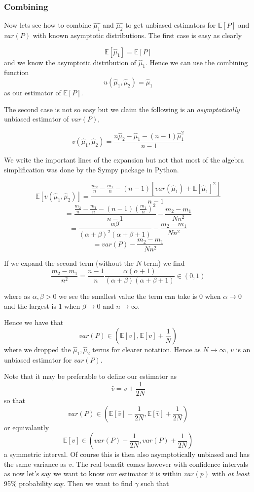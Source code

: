 \documentclass[
10pt, %
a4paper, %
oneside, %
headinclude,footinclude, %
BCOR5mm, %
]{scrartcl}
\begin{document}
\subsubsection{Combining}
Now lets see how to combine $\hat{\mu_1}$ and $\hat{\mu_2}$ to get unbiased estimators for $\mathbb{E}[P]$ and $var(P)$ with known asymptotic distributions. The first case is easy as clearly

$$ \mathbb{E}[\hat{\mu}_1] = \mathbb{E}[P] $$
and we know the asymptotic distribution of $\hat{\mu}_1$. Hence we can use the combining function 
$$u(\hat{\mu}_1,\hat{\mu}_2) = \hat{\mu}_1$$ 
as our estimator of $\mathbb{E}[P]$. 

The second case is not so easy but we claim the following is an \textit{asymptotically} unbiased estimator of $var(P)$,

$$ v(\hat{\mu}_1,\hat{\mu}_2) = \frac{n \hat{\mu}_2 - \hat{\mu}_1 - (n-1)\hat{\mu}_1^2}{n-1}$$

We write the important lines of the expansion but not that most of the algebra simplification was done by the Sympy package in Python.

$$ \mathbb{E}[v(\hat{\mu}_1,\hat{\mu}_2)] = \frac{\frac{m_2}{n} - \frac{m_1}{n} - (n-1)[var(\hat{\mu}_1) + \mathbb{E}[\hat{\mu}_1]^2]}{n-1} $$
$$ = \frac{\frac{m_2}{n} - \frac{m_1}{n} - (n-1)(\frac{m_1}{n})^2}{n-1} - \frac{m_2 - m_1}{N n^2} $$
$$ = \frac{\alpha \beta}{(\alpha + \beta)^2(\alpha + \beta +1)} - \frac{m_2 - m_1}{N n^2} $$
$$ = var(P) - \frac{m_2 - m_1}{N n^2} $$

If we expand the second term (without the $N$ term) we find
$$\frac{m_2 - m_1}{n^2} = \frac{n-1}{n} \frac{\alpha(\alpha+1)}{(\alpha + \beta)(\alpha + \beta + 1)} \in (0, 1)$$

where as $\alpha, \beta > 0$ we see the smallest value the term can take is $0$ when $\alpha \rightarrow 0$ and the largest is $1$ when $\beta \rightarrow 0$ and $n \rightarrow \infty$.

Hence we have that
$$ var(P) \in (\mathbb{E}[v], \mathbb{E}[v] + \frac{1}{N}) $$
where we dropped the $\hat{\mu}_1,\hat{\mu}_2$ terms for clearer notation. Hence as $N \rightarrow \infty$, $v$ is an unbiased estimator for $var(P)$.

Note that it may be preferable to define our estimator as
$$ \hat{v} = v + \frac{1}{2N} $$
so that
$$ var(P) \in (\mathbb{E}[\hat{v}] - \frac{1}{2N}, \mathbb{E}[\hat{v}] + \frac{1}{2N}) $$
or equivalantly
$$ \mathbb{E}[\hat{v}] \in (var(P) - \frac{1}{2N}, var(P) + \frac{1}{2N}) $$
a symmetric interval. Of course this is then also asymptotically unbiased and has the same variance as $v$. The real benefit comes however with confidence intervals as now let's say we want to know our estimator $\hat{v}$ is within $var(p)$ with \textit{at least} 95\% probability say. Then we want to find $\gamma$ such that
\end{document}
